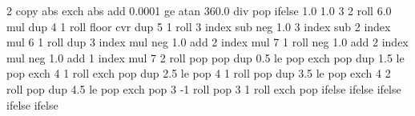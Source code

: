 {\pgfpoint{-50bp}{-50bp}}
{\pgfpoint{50bp}{50bp}}
{}
{ %
  2 copy abs exch abs add 0.0001 ge 
  {atan 360.0 div} %
  { pop } %
  ifelse  %
  1.0 1.0 %
  3 2 roll 6.0 mul dup 4 1 roll %
  floor cvr  %
  dup 5 1 roll %
  3 index sub neg %
  1.0 3 index sub %
  2 index mul %
  6 1 roll %
  dup 3 index mul neg 1.0 add %
  2 index mul %
  7 1 roll %
  neg 1.0 add %
  2 index mul neg 1.0  add %
  1 index mul %
  7 2 roll %
  pop pop %
  dup 0.5 le %
  { %
    pop exch pop
  }
  { dup 1.5 le %
    { %
      pop exch 4 1 roll exch pop
    }
    { dup 2.5 le %
      { %
        pop 4 1 roll pop
      }
      { dup 3.5 le %
        { %
          pop exch 4 2 roll pop
        }
        { dup 4.5 le %
          { %
            pop exch pop 3 -1 roll
          }
          { %
            pop 3 1 roll exch pop
          }
          ifelse
        }
        ifelse %
      }
      ifelse %
    }
    ifelse %
  }
  ifelse %
}


%
%


